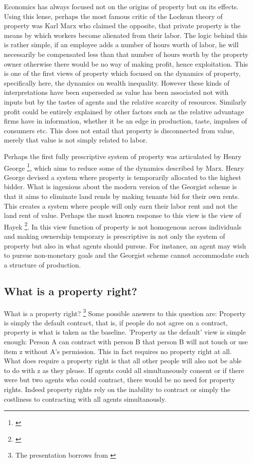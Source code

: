 \documentclass[12pt]{article}
\numberwithin{equation}{section}
\begin{document}
Economics has always focused not on the origins of property but on its effects. Using this lense, perhaps the most famous critic of the Lockean theory of property was Karl Marx who claimed the opposite, that private property is the means by which workers become alienated from their labor. The logic behind this is rather simple, if an employee adds a number of hours worth of labor, he will necessarily be compensated less than that number of hours worth by the property owner otherwise there would be no way of making profit, hence exploitation. This is one of the first views of property which focused on the dynamics of property, specifically here, the dynamics on wealth inequality. However these kinds of interpretations have been superseded as value has been associated not with inputs but by the tastes of agents and the relative scarcity of resources. Similarly profit could be entirely explained by other factors such as the relative advantage firms have in information, whether it be an edge in production, taste, impulses of consumers etc. This does not entail that property is disconnected from value, merely that value is not simply related to labor.

Perhaps the first fully prescriptive system of property was articulated by Henry George \footnote{\cite{progress}}, which aims to reduce some of the dynamics described by Marx. Henry George devised a system where property is temporarily allocated to the highest bidder. What is ingenious about the modern version of the Georgist scheme is that it aims to eliminate land rends by making tenants bid for their own rents. This creates a system where people will only earn their labor rent and not the land rent of value. Perhaps the most known response to this view is the view of Hayek \footnote{\cite{Fatal}}. In this view function of property is not homogenous across individuals and making ownership temporary is prescriptive in not only the system of property but also in what agents should pursue. For instance, an agent may wish to pursue non-monetary goals and the Georgist scheme cannot accommodate such a structure of production.


\newpage


\subsection{What is a property right?}

What is a property right? \footnote{The presentation borrows from \cite{Munzer1990}}
Some possible answers to this question are: Property is simply the default contract, that is, if people do not agree on a contract, property is what is taken as the baseline. 'Property as the default' view is simple enough: Person A can contract with person B that person B will not touch or use item z without A's permission. This in fact requires no property right at all. What does require a property right is that all other people will also not be able to do with z as they please. If agents could all simultaneously consent or if there were but two agents who could contract, there would be no need for property rights. Indeed property rights rely on the inability to contract or simply the costliness to contracting with all agents simultanously.
\end{document}
